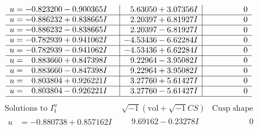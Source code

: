\documentclass[1p]{elsarticle_modified}
\theoremstyle{definition}
\newcommand{\I}{\sqrt{-1}}
\begin{document}
$$\begin{array}{c|c|c}
\begin{aligned}
u &= -0.823200 - 0.900365 I\end{aligned}
 & \phantom{-}5.63050 + 3.07356 I & \phantom{-0.000000 } 0 \\ \hline\begin{aligned}
u &= -0.886232 + 0.838665 I\end{aligned}
 & \phantom{-}2.20397 + 6.81927 I & \phantom{-0.000000 } 0 \\ \hline\begin{aligned}
u &= -0.886232 - 0.838665 I\end{aligned}
 & \phantom{-}2.20397 - 6.81927 I & \phantom{-0.000000 } 0 \\ \hline\begin{aligned}
u &= -0.782939 + 0.941062 I\end{aligned}
 & -4.53436 - 6.62284 I & \phantom{-0.000000 } 0 \\ \hline\begin{aligned}
u &= -0.782939 - 0.941062 I\end{aligned}
 & -4.53436 + 6.62284 I & \phantom{-0.000000 } 0 \\ \hline\begin{aligned}
u &= \phantom{-}0.883660 + 0.847398 I\end{aligned}
 & \phantom{-}9.22964 - 3.95082 I & \phantom{-0.000000 } 0 \\ \hline\begin{aligned}
u &= \phantom{-}0.883660 - 0.847398 I\end{aligned}
 & \phantom{-}9.22964 + 3.95082 I & \phantom{-0.000000 } 0 \\ \hline\begin{aligned}
u &= \phantom{-}0.803804 + 0.926221 I\end{aligned}
 & \phantom{-}3.27760 + 5.61427 I & \phantom{-0.000000 } 0 \\ \hline\begin{aligned}
u &= \phantom{-}0.803804 - 0.926221 I\end{aligned}
 & \phantom{-}3.27760 - 5.61427 I & \phantom{-0.000000 } 0\\
 \hline 
 \end{array}$$\newpage$$\begin{array}{c|c|c}  
\text{Solutions to }I^u_{1}& \I (\text{vol} + \sqrt{-1}CS) & \text{Cusp shape}\\
 \hline 
\begin{aligned}
u &= -0.880738 + 0.857162 I\end{aligned}
 & \phantom{-}9.69162 - 0.23278 I & \phantom{-0.000000 } 0 \\ \hline\begin{aligned}

\end{aligned}
\end{array}$$
\end{document}
